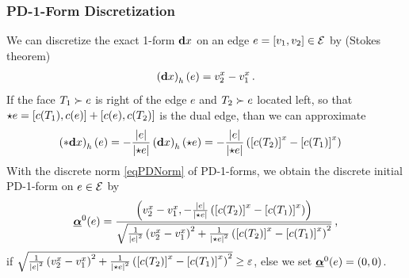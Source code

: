 \documentclass[a4paper,11pt]{scrartcl}
\begin{document}
\subsubsection{PD-1-Form Discretization}
We can discretize the exact 1-form \( \mathbf{d} x \) on an edge \( e=\left[ v_{1} , v_{2} \right]\in\mathcal{E} \) by (Stokes theorem)
\begin{align}
  \left( \mathbf{d} x \right)_{h}(e) = v_{2}^{x} - v_{1}^{x} \,\text{.} 
\end{align}
If the face \( T_{1}\succ e \) is right of the edge \( e \) and \( T_{2}\succ e \) located left, 
so that \( \star e = [c(T_{1}),c(e)] + [c(e),c(T_{2})] \) is the dual edge, than we can approximate
\begin{align}
  \left( *\mathbf{d} x \right)_{h}(e) &= -\frac{\left| e \right|}{\left| \star e \right|} \left( \mathbf{d} x \right)_{h}(\star e)
                                 = -\frac{\left| e \right|}{\left| \star e \right|} \left( \left[c(T_{2})  \right]^{x} - \left[c(T_{1})  \right]^{x} \right)
\end{align}
With the discrete norm \eqref{eqPDNorm} of PD-1-forms, we obtain the discrete initial PD-1-form on \( e \in \mathcal{E} \) by
\begin{align}
  \underline{\bm{\alpha}}^{0}(e) = \frac{
                   \left( v_{2}^{x} - v_{1}^{x}, 
                        -\frac{\left| e \right|}{\left| \star e \right|} \left( \left[c(T_{2})  \right]^{x} - \left[c(T_{1})  \right]^{x} \right)  \right)
                }{\sqrt{\frac{1}{\left| e \right|^{2}}\left(v_{2}^{x} - v_{1}^{x}  \right)^{2}
                                 +\frac{1}{\left| \star e \right|^{2}}\left( \left[c(T_{2})  \right]^{x} - \left[c(T_{1})
                                 \right]^{x}\right)^{2} }} \,\text{,}
\end{align}
if \( \sqrt{\frac{1}{\left| e \right|^{2}}\left(v_{2}^{x} - v_{1}^{x}  \right)^{2}
                                 +\frac{1}{\left| \star e \right|^{2}}\left( \left[c(T_{2})  \right]^{x} - \left[c(T_{1})
                                 \right]^{x}\right)^{2} } \ge \varepsilon \),
else we set \( \underline{\bm{\alpha}}^{0}(e) = (0,0) \).
\end{document}
